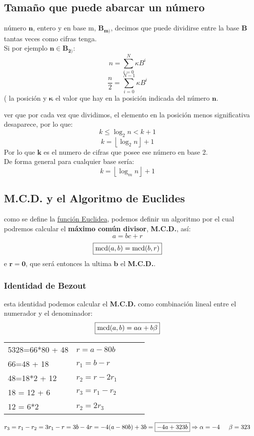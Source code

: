 \subsection{Tamaño que puede abarcar un número}
número \(\mathbf{n}\), entero y en base m, \(\mathbf{B_{m)}}\), decimos que puede dividirse entre la base \(\mathbf{B}\) tantas veces como cifras tenga.\\
Si por ejemplo \(\mathbf{n \in B_{2)}}\):
\[
        n = \sum^N_{i = 0} \kappa B^i
\]
\[
        \frac{n}{2} = \sum^{N-1}_{i = 0} \kappa B^i
\]
(\) la posición y \(\mathbf{\kappa}\) el valor que hay en la posición indicada del número \(\mathbf{n}\).\par
ver que por cada vez que dividimos, el elemento en la posición menos significativa desaparece, por lo que:
\[
        k \leq \log_{2}{n} < k + 1
\]
\[
        k = \left \lfloor \log_{2}n \right \rfloor + 1
\]
Por lo que \(\mathbf{k}\) es el numero de cifras que posee ese número en base 2. \\ De forma general para cualquier base sería:
\[
        \boxed{k = \left \lfloor \log_{m}n \right \rfloor + 1}
\]
\subsection{M.C.D. y el Algoritmo de Euclides}
 como se define la \underline{función Euclidea}, podemos definir un algoritmo por el cual podremos calcular el \textbf{máximo común divisor}, \textbf{M.C.D.}, así:
\[
        a = bc + r
\]
\[
        \boxed{\textnormal{mcd}(a,b) = \textnormal{mcd}(b,r)}
\] e \(\mathbf{r = 0}\), que será entonces la ultima \(\mathbf{b}\) el \textbf{M.C.D.}.
\subsubsection{Identidad de Bezout}
 esta identidad podemos calcular el \textbf{M.C.D.} como combinación lineal entre el numerador y el denominador:
\[
        \boxed{\textnormal{mcd}(a,b) = a\alpha + b\beta}
\]
\begin{table}[h]
        \begin{tabular}{l|llll}
                \cline{1-2}
                5328=66*80 + 48 & \(r = a - 80b\)     &  &  & \\ \cline{1-2}
                66=48 + 18      & \(r_1 = b - r\)     &  &  & \\ \cline{1-2}
                48=18*2 + 12    & \(r_2 = r - 2r_1\)  &  &  & \\ \cline{1-2}
                18 = 12 + 6     & \(r_3 = r_1 - r_2\) &  &  & \\ \cline{1-2}
                12 = 6*2        & \(r_2 = 2r_3\)      &  &  &
        \end{tabular}
\end{table}
\[
        r_3 = r_1 - r_2 = 3r_1 -r = 3b -4r = -4(a - 80b) +3b = \boxed{-4a +323b}\Rightarrow \alpha = -4 \hspace{5mm} \beta = 323
\]
